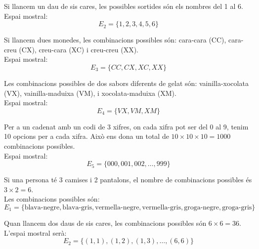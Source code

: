 \documentclass[12pt]{article}
\begin{document}
\begin{exemple}[title=Llançament d'un dau] \noindent Si llancem un dau de sis cares, les possibles sortides són els nombres del 1 al 6. \\

Espai mostral:
\[
E_2 = \{1, 2, 3, 4, 5, 6\}
\]
\end{exemple}

\begin{exemple} [title=Llançament de dues monedes] \noindent Si llancem dues monedes, les combinacions possibles són: cara-cara (CC), cara-creu (CX), creu-cara (XC) i creu-creu (XX). \\

Espai mostral:
\[
E_3 = \{CC, CX, XC, XX\}
\]
\end{exemple}

\begin{exemple} [title=Elecció d'un gelat]\noindent Les combinacions possibles de dos sabors diferents de gelat són: vainilla-xocolata (VX), vainilla-maduixa (VM), i xocolata-maduixa (XM). \\

Espai mostral:
\[
E_4 = \{VX, VM, XM\}
\]
\end{exemple}

\begin{exemple} [title=Combinacions d'un cadenat]\noindent Per a un cadenat amb un codi de 3 xifres, on cada xifra pot ser del 0 al 9, tenim 10 opcions per a cada xifra. Això ens dona un total de $10 \times 10 \times 10 = 1000$ combinacions possibles. \\

Espai mostral:
\[
E_5 = \{000, 001, 002, \dots, 999\}
\]
\end{exemple}

\begin{exemple}[title=Elecció de roba] \noindent Si una persona té 3 camises i 2 pantalons, el nombre de combinacions possibles és $3 \times 2 = 6$. \\

Les combinacions possibles són:
\[
E_1 = \{\text{blava-negre}, \text{blava-gris}, \text{vermella-negre}, \text{vermella-gris}, \text{groga-negre}, \text{groga-gris}\}
\]
\end{exemple}

\begin{exemple} [title=Llançament de dos daus]\noindent Quan llancem dos daus de sis cares, les combinacions possibles són $6 \times 6 = 36$. \\

L'espai mostral serà:
\[
E_2 = \{(1, 1), (1, 2), (1, 3), \dots, (6, 6)\}
\]
\end{exemple}
\end{document}
